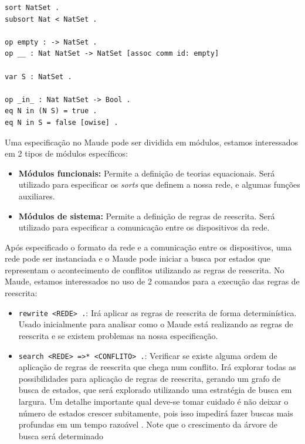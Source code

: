 {
\color{Red}
\begin{verbatim}
sort NatSet .
subsort Nat < NatSet .

op empty : -> NatSet .
op __ : Nat NatSet -> NatSet [assoc comm id: empty]

var S : NatSet .

op _in_ : Nat NatSet -> Bool .
eq N in (N S) = true .
eq N in S = false [owise] .
\end{verbatim}
}

Uma especificação no Maude pode ser dividida em módulos, estamos interessados em 2 tipos de módulos específicos:
\begin{itemize}
  \item \textbf{Módulos funcionais:} Permite a definição de teorias equacionais. Será utilizado para especificar os \textit{sorts} que definem a nossa rede, e algumas funções auxiliares.
  \item \textbf{Módulos de sistema:} Permite a definição de regras de reescrita. Será utilizado para especificar a comunicação entre os dispositivos da rede.
\end{itemize}

\noindent
Após especificado o formato da rede e a comunicação entre os dispositivos, uma rede pode ser instanciada e o Maude pode iniciar a busca por estados que representam o acontecimento de conflitos utilizando as regras de reescrita. No Maude, estamos interessados no uso de 2 comandos para a execução das regras de reescrita:
\begin{itemize}
  \item \texttt{rewrite <REDE> .}: Irá aplicar as regras de reescrita de forma determinística. Usado inicialmente para analisar como o Maude está realizando as regras de reescrita e se existem problemas na nossa especificação.
  \item \texttt{search <REDE> =>* <CONFLITO> .}: Verificar se existe alguma ordem de aplicação de regras de reescrita que chega num conflito. Irá explorar todas as possibilidades para aplicação de regras de reescrita, gerando um grafo de busca de estados, que será explorado utilizando uma estratégia de busca em largura. Um detalhe importante  qual deve-se tomar cuidado é não deixar o número de estados crescer subitamente, pois isso impedirá  fazer buscas mais profundas em um tempo razoável . Note que o crescimento da árvore de busca  será determinado 
\end{itemize}